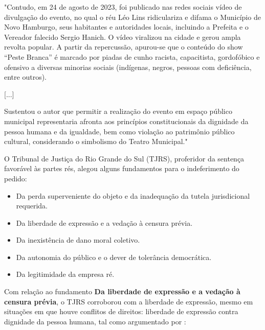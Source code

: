 \noindent
\begin{flushleft}
	\setlength{\leftskip}{4cm}
	\small
	"Contudo, em 24 de agosto de 2023, foi publicado nas redes sociais vídeo de divulgação do evento, no qual o réu Léo Lins ridiculariza e difama o Município de Novo Hamburgo, seus habitantes e autoridades locais, incluindo a Prefeita e o Vereador falecido Sergio Hanich. O vídeo viralizou na cidade e gerou ampla revolta popular. A partir da repercussão, apurou-se que o conteúdo do show “Peste Branca” é marcado por piadas de cunho racista, capacitista, gordofóbico e ofensivo a diversas minorias sociais (indígenas, negros, pessoas com deficiência, entre outros). 
	
	[...] 
	
	Sustentou o autor que permitir a realização do evento em espaço público municipal representaria afronta aos princípios constitucionais da dignidade da pessoa humana e da igualdade, bem como violação ao patrimônio público cultural, considerando o simbolismo do Teatro Municipal." \cite{liberdade_expressao_artistica_tjrs}
\end{flushleft}

O Tribunal de Justiça do Rio Grande do Sul (TJRS), proferidor da sentença favorável às partes rés, alegou alguns fundamentos para o indeferimento do pedido:

\begin{itemize}
	\item Da perda superveniente do objeto e da inadequação da tutela jurisdicional requerida.
	\item Da liberdade de expressão e a vedação à censura prévia.
	\item Da inexistência de dano moral coletivo.
	\item Da autonomia do público e o dever de tolerância democrática.
	\item Da legitimidade da empresa ré.
\end{itemize}

Com relação ao fundamento \textbf{Da liberdade de expressão e a vedação à censura prévia}, o TJRS corroborou com a liberdade de expressão, mesmo em situações em que houve conflitos de direitos: liberdade de expressão contra dignidade da pessoa humana, tal como argumentado por \cite{liberdade_expressao_artistica_tjrs}:

